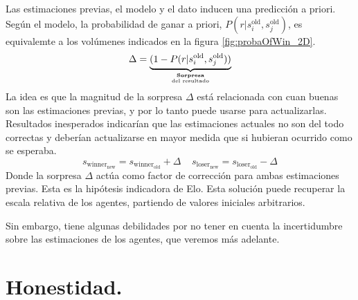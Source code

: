 \documentclass[a4paper,10pt]{book}
\begin{document}
%
Las estimaciones previas, el modelo y el dato inducen una predicción a priori.
%
%
Según el modelo, la probabilidad de ganar a priori, $P(r|s_i^{\text{old}},s_j^{\text{old}})$, es equivalemte a los volúmenes indicados en la figura \ref{fig:probaOfWin_2D}.
%
\begin{equation*}
 \Delta = \underbrace{(1 - P(r|s_i^{\text{old}},s_j^{\text{old}}))}_{\hfrac{\textbf{Sorpresa}}{\text{del resultado}}}
\end{equation*}
%
La idea es que la magnitud de la sorpresa $\Delta$ est\'a relacionada con cuan buenas son las estimaciones previas, y por lo tanto puede usarse para actualizarlas.
%
Resultados inesperados indicar\'ian que las estimaciones actuales no son del todo correctas y deber\'ian actualizarse en mayor medida que si hubieran ocurrido como se esperaba.
%
\begin{equation}\label{eq:elo_update}
 s_{\text{winner}_\text{new}} = s_{\text{winner}_\text{old}} + \Delta \ \ \ \ \ s_{\text{loser}_\text{new}} = s_{\text{loser}_\text{old}} - \Delta 
\end{equation}
%
Donde la sorpresa $\Delta$ act\'ua como factor de correcci\'on para ambas estimaciones previas.
%
Esta es la hipótesis indicadora de Elo.
%
Esta soluci\'on puede recuperar la escala relativa de los agentes, partiendo de valores iniciales arbitrarios.
%
\begin{center}
\end{center}
%
Sin embargo, tiene algunas debilidades por no tener en cuenta la incertidumbre sobre las estimaciones de los agentes, que veremos más adelante.


\section{Honestidad.}

\end{document}
